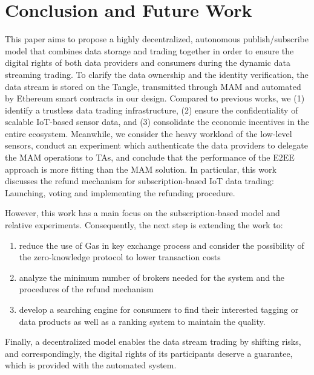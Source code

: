 \documentclass[conference]{IEEEtran}
\begin{document}
\section{Conclusion and Future Work}
\label{section:conclusion}
This paper aims to propose a highly decentralized, autonomous publish/subscribe model that combines data storage and trading together in order to ensure the digital rights of both data providers and consumers during the dynamic data streaming trading. To clarify the data ownership and the identity verification, the data stream is stored on the Tangle, transmitted through MAM and automated by Ethereum smart contracts in our design. Compared to previous works, we (1) identify a trustless data trading infrastructure, (2) ensure the confidentiality of scalable IoT-based sensor data, and (3) consolidate the economic incentives in the entire ecosystem. Meanwhile, we consider the heavy workload of the low-level sensors, conduct an experiment which authenticate the data providers to delegate the MAM operations to TAs, and conclude that the performance of the E2EE approach is more fitting than the MAM solution. In particular, this work discusses the refund mechanism for subscription-based IoT data trading: Launching, voting and implementing the refunding procedure.

However, this work has a main focus on the subscription-based model and relative experiments. Consequently, the next step is extending the work to:
\begin{enumerate}
	\item reduce the use of Gas in key exchange process and consider the possibility of the zero-knowledge protocol to lower transaction costs
	\item analyze the minimum number of brokers needed for the system and the procedures of the refund mechanism
	\item develop a searching engine for consumers to find their interested tagging or data products as well as a ranking system to maintain the quality.
\end{enumerate}

Finally, a decentralized model enables the data stream trading by shifting risks, and correspondingly, the digital rights of its participants deserve a guarantee, which is provided with the automated system.



\end{document}
